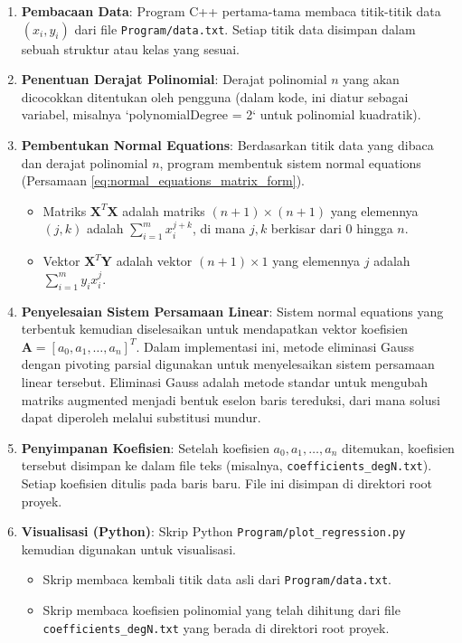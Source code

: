 \documentclass[conference]{IEEEtran}
\begin{document}
\begin{enumerate}
    \item \textbf{Pembacaan Data}: Program C++ pertama-tama membaca titik-titik data $(x_i, y_i)$ dari file \texttt{Program/data.txt}. Setiap titik data disimpan dalam sebuah struktur atau kelas yang sesuai.
    \item \textbf{Penentuan Derajat Polinomial}: Derajat polinomial $n$ yang akan dicocokkan ditentukan oleh pengguna (dalam kode, ini diatur sebagai variabel, misalnya `polynomialDegree = 2` untuk polinomial kuadratik).
    \item \textbf{Pembentukan Normal Equations}: Berdasarkan titik data yang dibaca dan derajat polinomial $n$, program membentuk sistem normal equations (Persamaan \ref{eq:normal_equations_matrix_form}).
    \begin{itemize}
        \item Matriks $\mathbf{X}^T\mathbf{X}$ adalah matriks $(n+1) \times (n+1)$ yang elemennya $(j, k)$ adalah $\sum_{i=1}^{m} x_i^{j+k}$, di mana $j, k$ berkisar dari $0$ hingga $n$.
        \item Vektor $\mathbf{X}^T\mathbf{Y}$ adalah vektor $(n+1) \times 1$ yang elemennya $j$ adalah $\sum_{i=1}^{m} y_i x_i^j$.
    \end{itemize}
    \item \textbf{Penyelesaian Sistem Persamaan Linear}: Sistem normal equations yang terbentuk kemudian diselesaikan untuk mendapatkan vektor koefisien $\mathbf{A} = [a_0, a_1, \dots, a_n]^T$. Dalam implementasi ini, metode eliminasi Gauss dengan pivoting parsial digunakan untuk menyelesaikan sistem persamaan linear tersebut. Eliminasi Gauss adalah metode standar untuk mengubah matriks augmented menjadi bentuk eselon baris tereduksi, dari mana solusi dapat diperoleh melalui substitusi mundur.
    \item \textbf{Penyimpanan Koefisien}: Setelah koefisien $a_0, a_1, \dots, a_n$ ditemukan, koefisien tersebut disimpan ke dalam file teks (misalnya, \texttt{coefficients\_degN.txt}). Setiap koefisien ditulis pada baris baru. File ini disimpan di direktori root proyek.
    \item \textbf{Visualisasi (Python)}: Skrip Python \texttt{Program/plot\_regression.py} kemudian digunakan untuk visualisasi.
    \begin{itemize}
        \item Skrip membaca kembali titik data asli dari \texttt{Program/data.txt}.
        \item Skrip membaca koefisien polinomial yang telah dihitung dari file \texttt{coefficients\_degN.txt} yang berada di direktori root proyek.

\end{itemize}
\end{enumerate}
\end{document}
